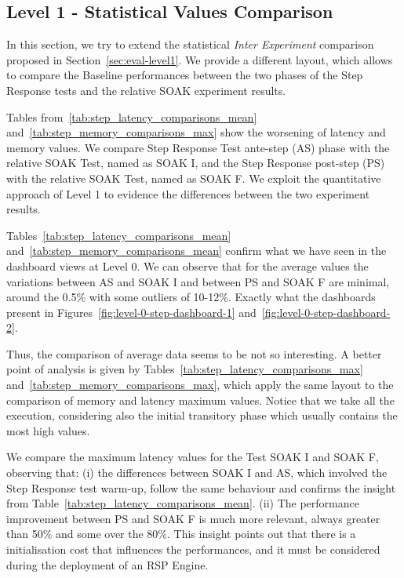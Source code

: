 \subsection{Level 1 - Statistical Values Comparison}\label{sec:level1-step-stats}


In this section, we try to extend the statistical \textit{Inter Experiment} comparison proposed in Section~\ref{sec:eval-level1}. We provide a different layout, which allows to compare the Baseline performances between the two phases of the Step Response tests and the relative SOAK experiment results.

Tables from~\ref{tab:step_latency_comparisons_mean} and~\ref{tab:step_memory_comparisons_max} show the worsening of latency and memory values. We compare Step Response Test ante-step (AS) phase with the relative SOAK Test, named as SOAK I, and the Step Response post-step (PS) with the relative SOAK Test, named as SOAK F.  We exploit the quantitative approach of Level 1 to evidence the differences between the two experiment results.


Tables~\ref{tab:step_latency_comparisons_mean} and~\ref{tab:step_memory_comparisons_mean} confirm what we have seen in the dashboard views at Level 0. We can observe that for the average values the variations between AS and SOAK I and between PS and SOAK F are minimal, around the 0.5\%  with some outliers of 10-12\%. Exactly what the dashboards present in Figures~\ref{fig:level-0-step-dashboard-1} and~\ref{fig:level-0-step-dashboard-2}. 

Thus, the comparison of average data seems to be not so interesting. A better point of analysis is given by Tables~\ref{tab:step_latency_comparisons_max} and~\ref{tab:step_memory_comparisons_max}, which apply the same layout to the comparison of memory and latency maximum values. Notice that we take all the execution, considering also the initial transitory phase which usually contains the most high values.

We compare the maximum latency values for the Test SOAK I and SOAK F, observing that: (i) the differences between SOAK I and AS, which involved the Step Response test warm-up, follow the same behaviour and confirms the insight from Table~\ref{tab:step_latency_comparisons_mean}. (ii) The performance improvement between PS and SOAK F is much more relevant, always greater than 50\% and some over the 80\%. This insight points out that there is a initialisation cost that influences the performances, and it must be considered during the deployment of an RSP Engine. 

